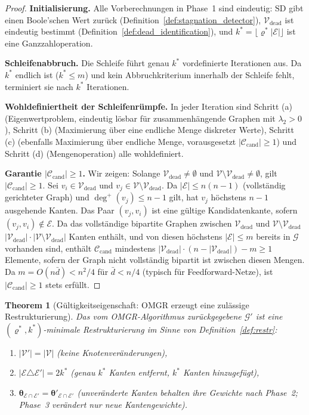 ﻿\documentclass[12pt, a4paper, openany]{report}
\newtheorem{theorem}{Theorem}[chapter]
\newcommand{\calG}{\mathcal{G}}
\newcommand{\calV}{\mathcal{V}}
\newcommand{\calE}{\mathcal{E}}
\newcommand{\calC}{\mathcal{C}}
\begin{document}
\begin{proof}
\textbf{Initialisierung.}
Alle Vorberechnungen in Phase~1 sind eindeutig:
$\mathrm{SD}$ gibt einen Boole'schen Wert zurück (Definition~\ref{def:stagnation_detector}),
$\calV_{\mathrm{dead}}$ ist eindeutig bestimmt (Definition~\ref{def:dead_identification}),
und $k^* = \lfloor\varrho^* |\calE|\rfloor$ ist eine Ganzzahloperation.

\textbf{Schleifenabbruch.}
Die Schleife führt genau $k^*$ vordefinierte Iterationen aus.  Da $k^*$ endlich
ist ($k^* \leq m$) und kein Abbruchkriterium innerhalb der Schleife fehlt,
terminiert sie nach $k^*$ Iterationen.

\textbf{Wohldefiniertheit der Schleifenrümpfe.}
In jeder Iteration sind Schritt (a) (Eigenwertproblem, eindeutig lösbar
für zusammenhängende Graphen mit $\lambda_2 > 0$), Schritt (b) (Maximierung
über eine endliche Menge diskreter Werte), Schritt (c) (ebenfalls Maximierung
über endliche Menge, vorausgesetzt $|\calC_{\mathrm{cand}}| \geq 1$) und
Schritt (d) (Mengenoperation) alle wohldefiniert.

\textbf{Garantie $|\calC_{\mathrm{cand}}| \geq 1$.}
Wir zeigen: Solange $\calV_{\mathrm{dead}} \neq \emptyset$ und
$\calV \setminus \calV_{\mathrm{dead}} \neq \emptyset$, gilt
$|\calC_{\mathrm{cand}}| \geq 1$.
Sei $v_i \in \calV_{\mathrm{dead}}$ und $v_j \in \calV \setminus \calV_{\mathrm{dead}}$.
Da $|\calE| \leq n(n-1)$ (vollständig gerichteter Graph) und
$\deg^+(v_j) \leq n - 1$ gilt, hat $v_j$ höchstens $n-1$ ausgehende
Kanten.  Das Paar $(v_j, v_i)$ ist eine gültige Kandidatenkante,
sofern $(v_j, v_i) \notin \calE$.  Da das vollständige bipartite Graphen
zwischen $\calV_{\mathrm{dead}}$ und $\calV \setminus \calV_{\mathrm{dead}}$
$|\calV_{\mathrm{dead}}| \cdot |\calV \setminus \calV_{\mathrm{dead}}|$
Kanten enthält, und von diesen höchstens $|\calE| \leq m$ bereits in $\calG$
vorhanden sind, enthält $\calC_{\mathrm{cand}}$ mindestens
$|\calV_{\mathrm{dead}}| \cdot (n - |\calV_{\mathrm{dead}}|) - m \geq 1$ Elemente,
sofern der Graph nicht vollständig bipartit ist zwischen diesen Mengen.
Da $m = O(n \bar{d}) < n^2/4$ für $\bar{d} < n/4$ (typisch für
Feedforward-Netze), ist $|\calC_{\mathrm{cand}}| \geq 1$ stets erfüllt.
\end{proof}

\begin{theorem}[Gültigkeitseigenschaft: OMGR erzeugt eine zulässige Restrukturierung]
\label{thm:omgr_validity}
Das vom OMGR-Algorithmus zurückgegebene $\calG'$ ist eine
$(\varrho^*, k^*)$-minimale Restrukturierung im Sinne von
Definition~\ref{def:restr}:
\begin{enumerate}[label=(\alph*)]
  \item $|\calV'| = |\calV|$ \quad (keine Knotenveränderungen),
  \item $|\calE \triangle \calE'| = 2k^*$ \quad (genau $k^*$ Kanten
        entfernt, $k^*$ Kanten hinzugefügt),
  \item $\bm{\theta}_{\calE \cap \calE'} = \bm{\theta}'_{\calE \cap \calE'}$
        \quad (unveränderte Kanten behalten ihre Gewichte nach Phase~2;
        Phase~3 verändert nur neue Kantengewichte).
\end{enumerate}
\end{theorem}
\end{document}
